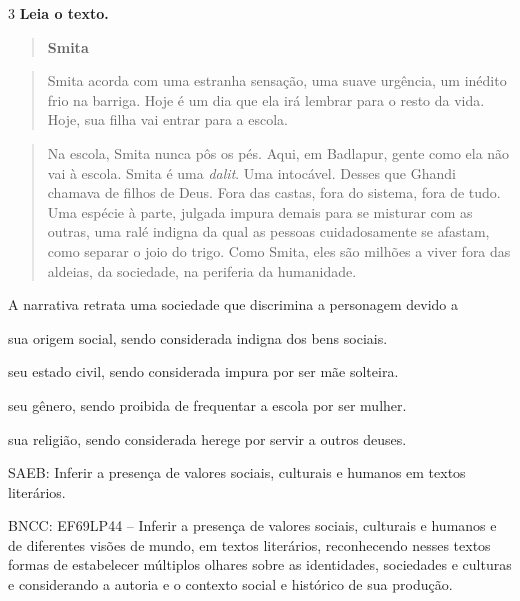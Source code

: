 \num{3} \textbf{Leia o texto.}

\begin{quote}
\textbf{Smita}
\end{quote}

\begin{quote}
Smita acorda com uma estranha sensação, uma suave urgência, um inédito
frio na barriga. Hoje é um dia que ela irá lembrar para o resto da vida.
Hoje, sua filha vai entrar para a escola.
\end{quote}

\begin{quote}
Na escola, Smita nunca pôs os pés. Aqui, em Badlapur, gente como ela não
vai à escola. Smita é uma \emph{dalit}. Uma intocável. Desses que Ghandi
chamava de filhos de Deus. Fora das castas, fora do sistema, fora de
tudo. Uma espécie à parte, julgada impura demais para se misturar com as
outras, uma ralé indigna da qual as pessoas cuidadosamente se afastam,
como separar o joio do trigo. Como Smita, eles são milhões a viver fora
das aldeias, da sociedade, na periferia da humanidade.
\end{quote}


A narrativa retrata uma sociedade que discrimina a personagem devido a

\begin{escolha}
\item sua origem social, sendo considerada indigna dos bens sociais.

\item seu estado civil, sendo considerada impura por ser mãe solteira.

\item seu gênero, sendo proibida de frequentar a escola por ser mulher.

\item sua religião, sendo considerada herege por servir a outros deuses.
\end{escolha}

SAEB: Inferir a presença de valores sociais, culturais e humanos em
textos literários. 

BNCC: EF69LP44 -- Inferir a presença de valores
sociais, culturais e humanos e de diferentes visões de mundo, em textos
literários, reconhecendo nesses textos formas de estabelecer múltiplos
olhares sobre as identidades, sociedades e culturas e considerando a
autoria e o contexto social e histórico de sua produção.

